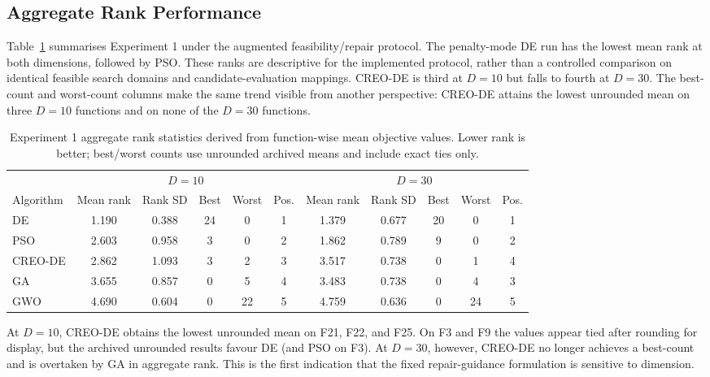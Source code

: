 \documentclass[a4paper,fleqn]{cas-sc}
\begin{document}
\subsection{Aggregate Rank Performance}

Table~\ref{tab:ranks} summarises Experiment 1 under the augmented feasibility/repair protocol. The penalty-mode DE run has the lowest mean rank at both dimensions, followed by PSO. These ranks are descriptive for the implemented protocol, rather than a controlled comparison on identical feasible search domains and candidate-evaluation mappings. CREO-DE is third at $D=10$ but falls to fourth at $D=30$. The best-count and worst-count columns make the same trend visible from another perspective: CREO-DE attains the lowest unrounded mean on three $D=10$ functions and on none of the $D=30$ functions.

\begin{table}[t]
\centering
\caption{Experiment 1 aggregate rank statistics derived from function-wise mean objective values. Lower rank is better; best/worst counts use unrounded archived means and include exact ties only.}
\label{tab:ranks}
\small
\begin{tabular}{lccccc|ccccc}
\toprule
& \multicolumn{5}{c}{$D=10$} & \multicolumn{5}{c}{$D=30$}\\
\cmidrule(lr){2-6}\cmidrule(lr){7-11}
Algorithm & Mean rank & Rank SD & Best & Worst & Pos. &
Mean rank & Rank SD & Best & Worst & Pos.\\
\midrule
DE      & 1.190 & 0.388 & 24 & 0  & 1 & 1.379 & 0.677 & 20 & 0  & 1\\
PSO     & 2.603 & 0.958 & 3  & 0  & 2 & 1.862 & 0.789 & 9  & 0  & 2\\
CREO-DE & 2.862 & 1.093 & 3  & 2  & 3 & 3.517 & 0.738 & 0  & 1  & 4\\
GA      & 3.655 & 0.857 & 0  & 5  & 4 & 3.483 & 0.738 & 0  & 4  & 3\\
GWO     & 4.690 & 0.604 & 0  & 22 & 5 & 4.759 & 0.636 & 0  & 24 & 5\\
\bottomrule
\end{tabular}
\end{table}

At $D=10$, CREO-DE obtains the lowest unrounded mean on F21, F22, and F25. On F3 and F9 the values appear tied after rounding for display, but the archived unrounded results favour DE (and PSO on F3). At $D=30$, however, CREO-DE no longer achieves a best-count and is overtaken by GA in aggregate rank. This is the first indication that the fixed repair-guidance formulation is sensitive to dimension.
\end{document}

